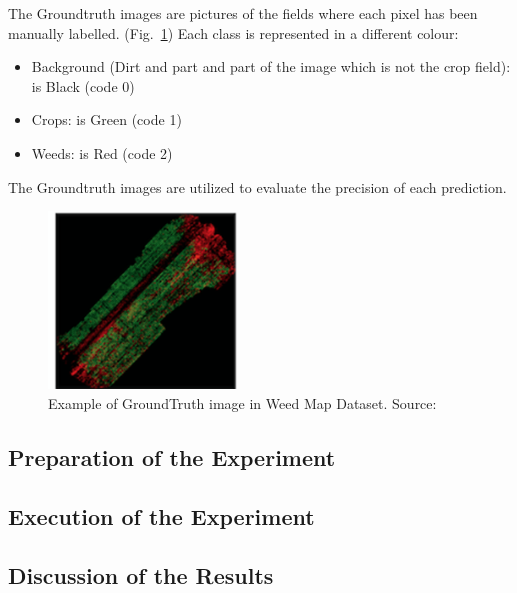The Groundtruth images are pictures of the fields where each pixel has been manually labelled. (Fig.~\ref{fig:figure-4.5.4})
Each class is represented in a different colour:
\begin{itemize}[itemsep=0.1cm]
	\item Background (Dirt and part and part of the image which is not the crop field): is Black (code 0)
	\item Crops: is Green (code 1)
	\item Weeds: is Red (code 2)
\end{itemize}
The Groundtruth images are utilized to evaluate the precision of each prediction.
\begin{figure}[t]
	\centering
	\includegraphics[width=5cm]{figures/figure-4.5.4.png}
	\caption[Example of GroundTruth in Weed Map Dataset]{Example of GroundTruth image in Weed Map Dataset. Source:~\cite{Tesi-2.1}}
	\label{fig:figure-4.5.4}
\end{figure}

\subsection{Preparation of the Experiment}

\subsection{Execution of the Experiment}

\subsection{Discussion of the Results}


